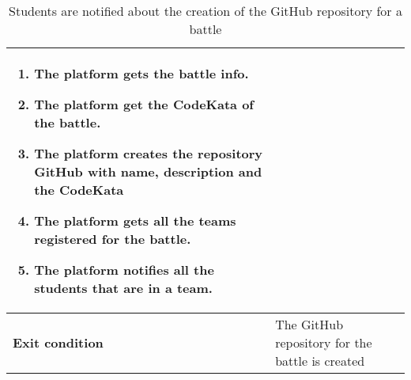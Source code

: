 \begin{enumerate}[label=\textbf{UC\arabic*}:,leftmargin=1.3cm]
\begin{table}[H]
\begin{tabular}{|l|p{11.9cm}|}
\begin{enumerate}[label=\arabic*.]
                              \item The platform gets the battle info.
                              \item The platform get the CodeKata of the battle.
                              \item The platform creates the repository GitHub with name, description and the CodeKata
                              \item The platform gets all the teams registered for the battle.
                              \item The platform notifies all the students that are in a team.
                        \end{enumerate} \\\hline
                        \textbf{Exit condition}  & The GitHub repository for the battle is created                                   \\\hline
                  \end{tabular}
                  \caption{Students are notified about the creation of the GitHub repository for a battle  }
                  \label{table:Students are notified about the creation of the GitHub repository for a battle}
            \end{table}


\end{enumerate}

